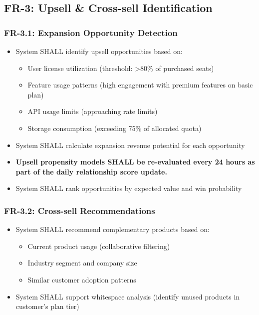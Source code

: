 \documentclass[12pt,a4paper]{article}
\begin{document}
\subsection{FR-3: Upsell \& Cross-sell Identification}
\subsubsection{FR-3.1: Expansion Opportunity Detection}
\begin{itemize}
    \item System SHALL identify upsell opportunities based on:
    \begin{itemize}
        \item User license utilization (threshold: >80\% of purchased seats)
        \item Feature usage patterns (high engagement with premium features on basic plan)
        \item API usage limits (approaching rate limits)
        \item Storage consumption (exceeding 75\% of allocated quota)
    \end{itemize}
    \item System SHALL calculate expansion revenue potential for each opportunity
    \item \textbf{Upsell propensity models SHALL be re-evaluated every 24 hours as part of the daily relationship score update.}
    \item System SHALL rank opportunities by expected value and win probability
\end{itemize}
\subsubsection{FR-3.2: Cross-sell Recommendations}
\begin{itemize}
    \item System SHALL recommend complementary products based on:
    \begin{itemize}
        \item Current product usage (collaborative filtering)
        \item Industry segment and company size
        \item Similar customer adoption patterns
    \end{itemize}
    \item System SHALL support whitespace analysis (identify unused products in customer’s plan tier)
\end{itemize}
\end{document}
